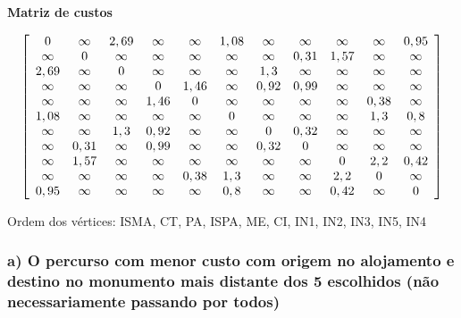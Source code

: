 \documentclass[12pt]{article}
\begin{document}
    \begin{center}
        \noindent \textbf{Matriz de custos}
    \end{center}
    
    $$
        \left[
            \begin{array}{*{11}c}
               			0 & \infty& 2,69 & \infty& \infty& 1,08 & \infty& \infty& \infty& \infty& 0,95 \\ 
                \infty& 0 & \infty& \infty& \infty& \infty& \infty& 0,31 & 1,57 & \infty& \infty\\ 
                2,69 & \infty& 0 & \infty& \infty& \infty& 1,3 & \infty& \infty& \infty& \infty\\ 
                \infty& \infty& \infty& 0 & 1,46 & \infty& 0,92 & 0,99 & \infty& \infty& \infty\\ 
                \infty& \infty& \infty& 1,46 & 0 & \infty& \infty& \infty& \infty& 0,38 & \infty\\ 
                1,08 & \infty& \infty& \infty& \infty& 0 & \infty& \infty& \infty& 1,3 & 0,8 \\ 
                \infty& \infty& 1,3 & 0,92 & \infty& \infty& 0 & 0,32 & \infty& \infty& \infty\\ 
                \infty& 0,31 & \infty& 0,99 & \infty& \infty& 0,32 & 0 & \infty& \infty& \infty\\ 
                \infty& 1,57 & \infty& \infty& \infty& \infty& \infty& \infty& 0 & 2,2 & 0,42 \\ 
                \infty& \infty& \infty& \infty& 0,38 & 1,3 & \infty& \infty& 2,2 & 0 & \infty\\ 
                0,95 & \infty& \infty& \infty& \infty& 0,8 & \infty& \infty& 0,42 & \infty& 0
            \end{array}
            \right]
    $$
    
    \noindent Ordem dos vértices: ISMA, CT, PA, ISPA, ME, CI, IN1, IN2, IN3, IN5, IN4\\
    
    \newpage
    \subsubsection{a) O percurso com menor custo com origem no alojamento e destino no monumento mais distante dos 5 escolhidos (não necessariamente passando por todos)}
\end{document}
